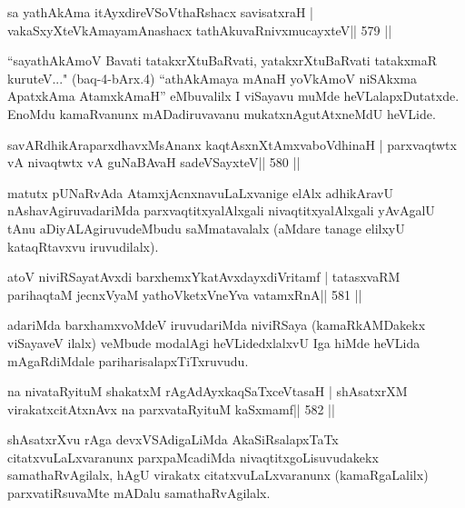 

\begin{shl}
sa yathAkAma itAyxdireVSoV\s thaRshacx savisatxraH |
vakaSxyXteV\s kAmayamAnashacx tathA\s kuvaRnivxmucayxteV\hfill || 579 ||
\end{shl}

\begin{artha}
``sayathAkAmoV Bavati tatakxrXtuBaRvati, yatakxrXtuBaRvati tatakxmaR
  kuruteV..." (baq-4-bArx.4) ``athA\s kAmaya mAnaH yoV\s kAmoV
  niSAkxma ApatxkAma AtamxkAmaH'' eMbuvalilx I viSayavu muMde
  heVLalapxDutatxde. EnoMdu kamaRvanunx mADadiruvavanu
  mukatxnAgutAtxneMdU heVLide.
\end{artha}

\begin{shl}
savARdhikAraparxdhavxMsAnanx kaqtAsxnXtAmxvaboVdhinaH |
parxvaqtwtx vA nivaqtwtx vA guNaBAvaH sadeVSayxteV\hfill || 580 ||
\end{shl}

\begin{artha}
matutx pUNaRvAda AtamxjAcnxnavuLaLxvanige elAlx adhikAravU nAshavAgiruvadariMda parxvaqtitxyalAlxgali nivaqtitxyalAlxgali yAvAgalU tAnu aDiyALAgiruvudeMbudu saMmatavalalx (aMdare tanage elilxyU kataqRtavxvu iruvudilalx).
\end{artha}

\begin{shl}
atoV niviRSayatAvxdi barxhemxYkatAvxdayxdiVritamf |
tatasxvaRM parihaqtaM jecnxVyaM yathoVketxVneYva vatamxRnA\hfill || 581 ||
\end{shl}

\begin{artha}
adariMda barxhamxvoMdeV iruvudariMda niviRSaya (kamaRkAMDakekx viSayaveV ilalx) veMbude modalAgi heVLidedxlalxvU Iga hiMde heVLida mAgaRdiMdale pariharisalapxTiTxruvudu.
\end{artha}



\begin{shl}
na nivataRyituM shakatxM rAgAdAyxkaqSaTxceVtasaH |
shAsatxrXM virakatxcitAtxnAvx na parxvataRyituM kaSxmamf\hfill || 582 ||
\end{shl}

\begin{artha}
shAsatxrXvu rAga devxVSAdigaLiMda AkaSiRsalapxTaTx citatxvuLaLxvaranunx  parxpaMcadiMda nivaqtitxgoLisuvudakekx samathaRvAgilalx, hAgU virakatx citatxvuLaLxvaranunx (kamaRgaLalilx) parxvatiRsuvaMte mADalu samathaRvAgilalx.
\end{artha}

